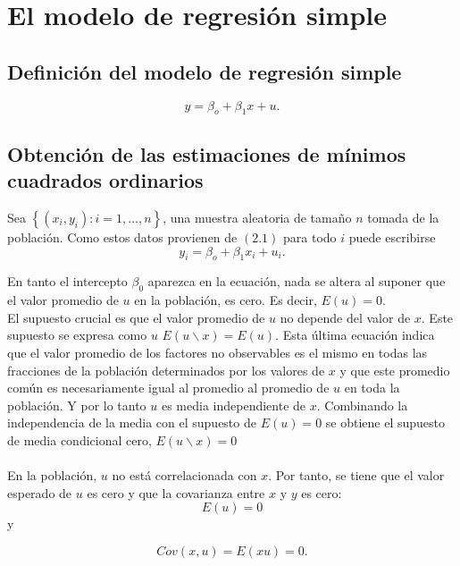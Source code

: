 \setcounter{chapter}{1}
\chapter{El modelo de regresión simple}
\section{Definición del modelo de regresión simple}
\begin{equation}
    y = \beta_o + \beta_1x + u.
\end{equation}

\section{Obtención de las estimaciones de mínimos cuadrados ordinarios}

Sea $\left\{(x_i,y_i): i = 1,\ldots,n\right\}$, una muestra aleatoria de tamaño $n$ tomada de la población. Como estos datos provienen de $(2.1)$ para todo $i$ puede escribirse 
\begin{equation}
    y_i = \beta_o + \beta_1x_i + u_i.
\end{equation}

En tanto el intercepto $\beta_0$ aparezca en la ecuación, nada se altera al suponer que el valor promedio de $u$ en la población, es cero. Es decir, $E(u)=0$.\\
El supuesto crucial es que el valor promedio de $u$ no depende del valor de $x$. Este supuesto se expresa como $u$ $E(u\backslash x) = E(u)$. Esta última ecuación indica que el valor promedio de los factores no observables es el mismo en todas las fracciones de la población determinados por los valores de $x$ y que este promedio común es necesariamente igual al promedio al promedio de $u$ en toda la población. Y por lo tanto $u$ es media independiente de $x$. Combinando la independencia de la media con el supuesto de $E(u)=0$ se obtiene el supuesto de media condicional cero, $E(u\backslash x) = 0$\\\\

En la población, $u$ no está correlacionada con $x$. Por tanto, se tiene que el valor esperado de $u$ es cero y que la covarianza entre $x$ y $y$ es cero:
\begin{equation}
    E(u)=0
\end{equation}
 y 

\begin{equation}
    Cov(x,u) = E(xu) =0.
\end{equation}

